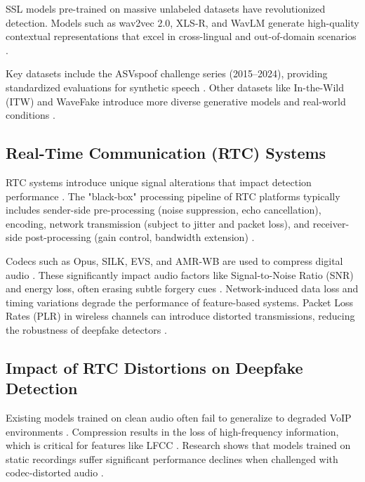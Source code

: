 SSL models pre-trained on massive unlabeled datasets have revolutionized detection. Models such as wav2vec 2.0, XLS-R, and WavLM generate high-quality contextual representations that excel in cross-lingual and out-of-domain scenarios \cite{Pianese2022, Li2024_survey, ZhangB2025}.

Key datasets include the ASVspoof challenge series (2015–2024), providing standardized evaluations for synthetic speech \cite{Yamagishi2021, Wang2024_asv5, Li2024_survey}. Other datasets like In-the-Wild (ITW) and WaveFake introduce more diverse generative models and real-world conditions \cite{Li2024_survey, ZhangB2025}.

\subsection{Real-Time Communication (RTC) Systems}

RTC systems introduce unique signal alterations that impact detection performance \cite{Mathew2024, Xue2025_RTCFake}. The "black-box" processing pipeline of RTC platforms typically includes sender-side pre-processing (noise suppression, echo cancellation), encoding, network transmission (subject to jitter and packet loss), and receiver-side post-processing (gain control, bandwidth extension) \cite{Xue2025_RTCFake}.

Codecs such as Opus, SILK, EVS, and AMR-WB are used to compress digital audio \cite{Xue2025_RTCFake, Shi2024}. These significantly impact audio factors like Signal-to-Noise Ratio (SNR) and energy loss, often erasing subtle forgery cues \cite{Pham2024, Shi2024}. Network-induced data loss and timing variations degrade the performance of feature-based systems. Packet Loss Rates (PLR) in wireless channels can introduce distorted transmissions, reducing the robustness of deepfake detectors \cite{Shi2024}.

\subsection{Impact of RTC Distortions on Deepfake Detection}

Existing models trained on clean audio often fail to generalize to degraded VoIP environments \cite{Mathew2024, Shi2024}. Compression results in the loss of high-frequency information, which is critical for features like LFCC \cite{Li2024_survey, Shi2024}. Research shows that models trained on static recordings suffer significant performance declines when challenged with codec-distorted audio \cite{Mathew2024, Shi2024}.

